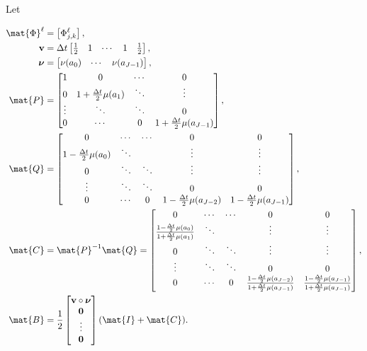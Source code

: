 \documentclass{jpmarticle}
\renewcommand{\vec}[1]{\boldsymbol{\mathrm{#1}}}
\let\subequationsorig\subequations%
\let\endsubequationsorig\endsubequations%
\renewenvironment{subequations}{
  \subequationsorig
  \renewcommand{\theequation}{\theparentequation.\arabic{equation}}
}{
  \endsubequationsorig
}
\begin{document}
Let
\begin{subequations}
  \begin{align}
    \mat{\Phi}^{\ell}
    &= \left[\Phi_{j, k}^{\ell}\right],
    \\
    \vec{v} &=
    \Delta t
    \begin{bmatrix}
      \frac{1}{2} & 1 & \cdots & 1 & \frac{1}{2}
    \end{bmatrix},
    \\
    \vec{\nu} &=
    \begin{bmatrix}
      \nu(a_0) & \cdots & \nu(a_{J - 1})
    \end{bmatrix},
    \\
    \mat{P} &=
    \begin{bmatrix}
      1 & 0 & \cdots & 0
      \\
      0 & 1 + \frac{\Delta t}{2} \mu(a_1) &
      \ddots & \vdots
      \\
      \vdots & \ddots & \ddots & 0
      \\
      0 & \cdots & 0 &
      1 + \frac{\Delta t}{2} \mu(a_{J - 1})
    \end{bmatrix},
    \\
    \mat{Q} &=
    \begin{bmatrix}
      0 & \cdots & \cdots & 0 & 0
      \\
      1 - \frac{\Delta t}{2} \mu(a_0) & \ddots &
      & \vdots & \vdots
      \\
      0 & \ddots & \ddots & \vdots & \vdots
      \\
      \vdots & \ddots & \ddots & 0 & 0
      \\
      0 & \cdots & 0
      & 1 - \frac{\Delta t}{2} \mu(a_{J - 2})
      & 1 - \frac{\Delta t}{2} \mu(a_{J - 1})
    \end{bmatrix},
    \\
    \mat{C}
    &= \mat{P}^{-1} \mat{Q}
    =
    \begin{bmatrix}
      0 & \cdots & \cdots & 0 & 0
      \\
      \frac{1 - \frac{\Delta t}{2} \mu(a_0)}
      {1 + \frac{\Delta t}{2} \mu(a_1)}
      & \ddots & & \vdots & \vdots
      \\
      0 & \ddots & \ddots & \vdots & \vdots
      \\
      \vdots & \ddots & \ddots & 0 & 0
      \\
      0 & \cdots & 0 &
      \frac{1 - \frac{\Delta t}{2} \mu(a_{J - 2})}
      {1 + \frac{\Delta t}{2} \mu(a_{J - 1})}
      & \frac{1 - \frac{\Delta t}{2} \mu(a_{J - 1})}
      {1 + \frac{\Delta t}{2} \mu(a_{J - 1})}
    \end{bmatrix},
    \\
    \mat{B} &=
    \frac{1}{2}
    \begin{bmatrix}
      \vec{v} \circ \vec{\nu} \\ \vec{0} \\ \vdots \\ \vec{0}
    \end{bmatrix}
    (\mat{I} + \mat{C}).
  \end{align}
\end{subequations}
\end{document}
